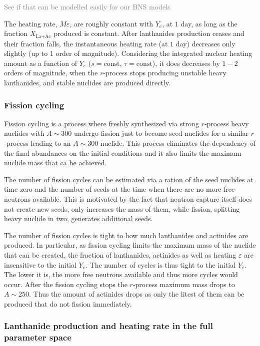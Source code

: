 \documentclass[11pt,a4paper,headinclude=true,DIV=14,BCOR=8mm,chapterprefix,listof=totoc,twoside,openright,abstracton]{scrbook}
\newcommand{\gray}[1]{\textcolor{gray}{#1}}
\begin{document}
\gray{See if that can be modelled easily for our BNS models}

The heating rate, $M\varepsilon$, are roughly constant with $Y_e$, at $1$ day, as long as the fraction $X_{\text{La+Ac}}$ produced is constant. 
After lanthanides production ceases and their fraction falls, the instantaneous heating rate (at $1$ day) decreases only slightly (up to $1$ order of magnitude). 
Considering the integrated nuclear heating amount as a function of $Y_e$ ($s=\text{const}$, $\tau=\text{const}$), it does decreases by $1-2$ orders of magnitude, when the $r$-process stops producing unstable heavy lanthanides, and stable nuclides are produced directly.


\subsubsection{Fission cycling}

Fission cycling is a process where freshly synthesized via strong $r$-process heavy nuclides with $A\sim 300$ undergo fission just to become seed nuclides for a similar $r$-process leading to an $A\sim 300$ nuclide. This process eliminates the dependency of the final abundances on the initial conditions and it also limits the maximum nuclide mass that ca be achieved. 

The number of fission cycles can be estimated via a ration of the seed nuclides at time zero and the number of seeds at the time when there are no more free neutrons available. This is motivated by the fact that neutron capture itself does not create new seeds, only increases the mass of them, while fission, splitting heavy nuclide in two, generates additional seeds. 

The number of fission cycles is tight to how much lanthanides and actinides are produced. In particular, as fission cycling limits the maximum mass of the nuclide that can be created, the fraction of lanthanides, actinides as well as heating $\varepsilon$ are insensitive to the initial $Y_e$. The number of cycles is thus tight to the initial $Y_e$. The lower it is, the more free neutrons available and thus more cycles would occur. After the fission cycling stops the $r$-process maximum mass drops to $A\sim 250$. Thus the amount of actinides drops as only the litest of them can be produced that do not fission immediately. 


\subsubsection{Lanthanide production and heating rate in the full parameter space}
\end{document}

